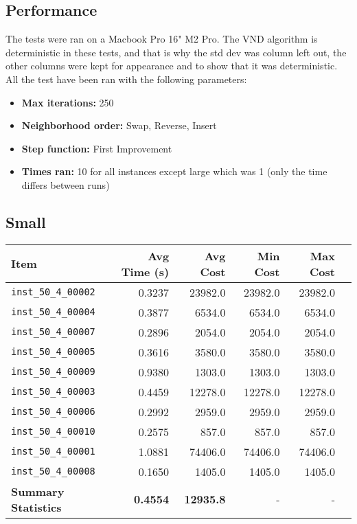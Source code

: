 \documentclass{article}
\begin{document}
\subsection*{Performance}
The tests were ran on a Macbook Pro 16" M2 Pro. The VND algorithm is deterministic in these tests, and that is why the std dev was column  left out, the other columns were kept for appearance and to show that it was deterministic. All the test have been ran with the following parameters: 
\begin{itemize}
	\item \textbf{Max iterations:} 250
	\item \textbf{Neighborhood order:} Swap, Reverse, Insert
	\item \textbf{Step function:} First Improvement
	\item \textbf{Times ran:} 10 for all instances except large which was 1 (only the time differs between runs)
\end{itemize}

\subsection*{Small}

\begin{table}[H]
	\centering
    \hspace*{-1cm}
	\begin{tabular}{lrrrrr}
		\toprule
		\textbf{Item} & \textbf{Avg Time (s)} & \textbf{Avg Cost} & \textbf{Min Cost} & \textbf{Max Cost}  \\
		\midrule
		\texttt{inst\_50\_4\_00002} & 0.3237 & 23982.0 & 23982.0 & 23982.0 \\ 
		\texttt{inst\_50\_4\_00004} & 0.3877 & 6534.0  & 6534.0  & 6534.0  \\ 
		\texttt{inst\_50\_4\_00007} & 0.2896 & 2054.0  & 2054.0  & 2054.0  \\ 
		\texttt{inst\_50\_4\_00005} & 0.3616 & 3580.0  & 3580.0  & 3580.0  \\ 
		\texttt{inst\_50\_4\_00009} & 0.9380 & 1303.0  & 1303.0  & 1303.0  \\ 
		\texttt{inst\_50\_4\_00003} & 0.4459 & 12278.0 & 12278.0 & 12278.0 \\ 
		\texttt{inst\_50\_4\_00006} & 0.2992 & 2959.0  & 2959.0  & 2959.0  \\ 
		\texttt{inst\_50\_4\_00010} & 0.2575 & 857.0   & 857.0   & 857.0   \\ 
		\texttt{inst\_50\_4\_00001} & 1.0881 & 74406.0 & 74406.0 & 74406.0 \\ 
		\texttt{inst\_50\_4\_00008} & 0.1650 & 1405.0  & 1405.0  & 1405.0  \\ 
		\midrule
		\textbf{Summary Statistics} & \textbf{0.4554} & \textbf{12935.8} & - & - \\
		\bottomrule
	\end{tabular}
	\label{tab:performance_metrics_small_vnd}
\end{table}
\end{document}
